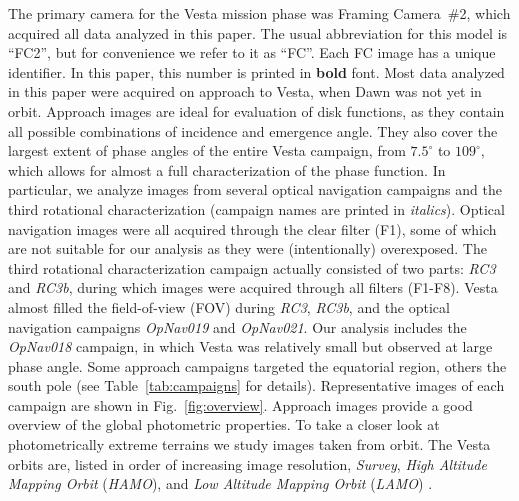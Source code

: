 \documentclass[3p,authoryear]{elsarticle}
\begin{document}
The primary camera for the Vesta mission phase was Framing Camera~\#2, which acquired all data analyzed in this paper. The usual abbreviation for this model is ``FC2'', but for convenience we refer to it as ``FC''. Each FC image has a unique identifier. In this paper, this number is printed in {\bf bold} font. Most data analyzed in this paper were acquired on approach to Vesta, when Dawn was not yet in orbit. Approach images are ideal for evaluation of disk functions, as they contain all possible combinations of incidence and emergence angle. They also cover the largest extent of phase angles of the entire Vesta campaign, from $7.5^\circ$ to $109^\circ$, which allows for almost a full characterization of the phase function. In particular, we analyze images from several optical navigation campaigns and the third rotational characterization (campaign names are printed in {\it italics}). Optical navigation images were all acquired through the clear filter (F1), some of which are not suitable for our analysis as they were (intentionally) overexposed. The third rotational characterization campaign actually consisted of two parts: {\it RC3} and {\it RC3b}, during which images were acquired through all filters (F1-F8). Vesta almost filled the field-of-view (FOV) during {\it RC3}, {\it RC3b}, and the optical navigation campaigns {\it OpNav019} and {\it OpNav021}. Our analysis includes the {\it OpNav018} campaign, in which Vesta was relatively small but observed at large phase angle. Some approach campaigns targeted the equatorial region, others the south pole (see Table~\ref{tab:campaigns} for details). Representative images of each campaign are shown in Fig.~\ref{fig:overview}. Approach images provide a good overview of the global photometric properties. To take a closer look at photometrically extreme terrains we study images taken from orbit. The Vesta orbits are, listed in order of increasing image resolution, {\it Survey}, {\it High Altitude Mapping Orbit} ({\it HAMO}), and {\it Low Altitude Mapping Orbit} ({\it LAMO}) \citep{R07}.
\end{document}
